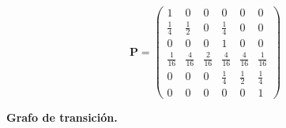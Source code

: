\documentclass[10pt,a4paper]{article}
\newcommand{\Pmat}{\mathbf{P}}
\begin{document}
\[
  \Pmat =
  \begin{pmatrix}
    1             & 0             & 0             & 0             & 0             & 0             \\[4pt]
    \tfrac{1}{4}  & \tfrac{1}{2}  & 0             & \tfrac{1}{4}  & 0             & 0             \\[4pt]
    0             & 0             & 0             & 1             & 0             & 0             \\[4pt]
    \tfrac{1}{16} & \tfrac{4}{16} & \tfrac{2}{16} & \tfrac{4}{16} & \tfrac{4}{16} & \tfrac{1}{16} \\[4pt]
    0             & 0             & 0             & \tfrac{1}{4}  & \tfrac{1}{2}  & \tfrac{1}{4}  \\[4pt]
    0             & 0             & 0             & 0             & 0             & 1
  \end{pmatrix}
\]

\medskip
\textbf{Grafo de transici\'on.}
\end{document}
